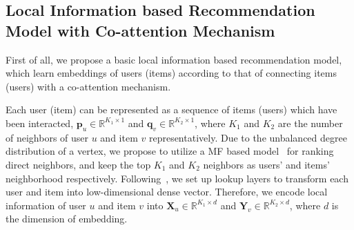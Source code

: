 \subsection{Local Information based Recommendation Model with Co-attention Mechanism} 
First of all, we propose a basic local information based recommendation model, which learn embeddings of users (items) according to that of connecting items (users) with a co-attention mechanism.


Each user (item) can be represented as a sequence of items (users) which have been interacted, \ie $\bm{p}_u \in \mathbb{R}^{K_1 \times 1}$ and $\bm{q}_v \in \mathbb{R}^{K_2 \times 1}$, where $K_1$ and $K_2$ are the number of neighbors of user $u$ and item $v$ representatively. 
Due to the unbalanced degree distribution of a vertex,
we propose to utilize a MF based model~\cite{rendle2009bpr} for ranking direct neighbors, and keep the top $K_1$ and $K_2$ neighbors as users' and items' neighborhood respectively. 
Following~\cite{he2017neural}, we set up  lookup layers to transform each user and item into low-dimensional dense vector. Therefore, we encode local information of user $u$ and item $v$ into $\bm{X}_u \in \mathbb{R}^{K_1 \times d}$ and $\bm{Y}_v \in \mathbb{R}^{K_2 \times d}$, where $d$ is the dimension of embedding.

